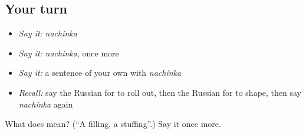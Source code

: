 \subsection*{Your turn}
\begin{itemize}
\raggedright
  \item \emph{Say it:} \emph{nachínka}
  \item \emph{Say it:} \emph{nachínka}, once more
  \item \emph{Say it:} a sentence of your own with \emph{nachínka}
  \item \emph{Recall:} say the Russian for to roll out, then the Russian for to shape, then say \emph{nachínka} again
\end{itemize}

\begin{tcolorbox}[breakable,colback=teal!4,colframe=teal!35!black,title={Before you move on}]
What does  mean? (\textquotedblleft{}A filling, a stuffing\textquotedblright{}.) Say it once more.
\end{tcolorbox}

